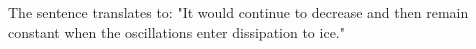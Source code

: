 The sentence translates to: "It would continue to decrease and then remain constant when the oscillations enter dissipation to ice."